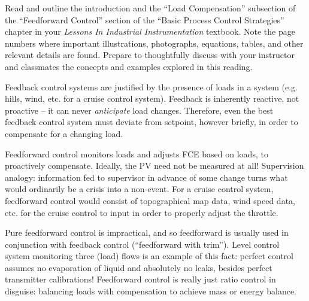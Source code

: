 

Read and outline the introduction and the ``Load Compensation'' subsection of the ``Feedforward Control'' section of the ``Basic Process Control Strategies'' chapter in your {\it Lessons In Industrial Instrumentation} textbook.  Note the page numbers where important illustrations, photographs, equations, tables, and other relevant details are found.  Prepare to thoughtfully discuss with your instructor and classmates the concepts and examples explored in this reading.














Feedback control systems are justified by the presence of loads in a system (e.g. hills, wind, etc. for a cruise control system).  Feedback is inherently reactive, not proactive -- it can never {\it anticipate} load changes.  Therefore, even the best feedback control system must deviate from setpoint, however briefly, in order to compensate for a changing load.

\vskip 10pt

Feedforward control monitors loads and adjusts FCE based on loads, to proactively compensate.  Ideally, the PV need not be measured at all!  Supervision analogy: information fed to supervisor in advance of some change turns what would ordinarily be a crisis into a non-event.  For a cruise control system, feedforward control would consist of topographical map data, wind speed data, etc. for the cruise control to input in order to properly adjust the throttle.

\vskip 10pt

Pure feedforward control is impractical, and so feedforward is usually used in conjunction with feedback control (``feedforward with trim'').  Level control system monitoring three (load) flows is an example of this fact: perfect control assumes no evaporation of liquid and absolutely no leaks, besides perfect transmitter calibrations!  Feedforward control is really just ratio control in disguise: balancing loads with compensation to achieve mass or energy balance.

